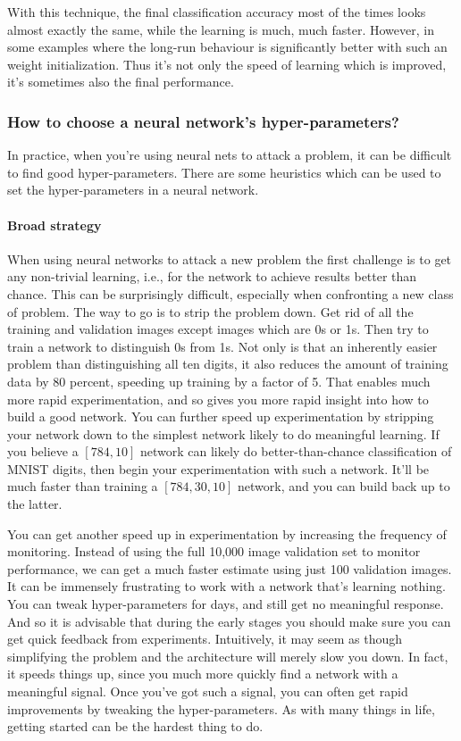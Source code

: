\documentclass[12pt, letterpaper]{article}
\theoremstyle{definition}
\let\tb\textbf
\begin{document}
With this technique, the final classification accuracy most of the times looks almost exactly the same, while the learning is much, much faster. However, in some examples where the long-run behaviour is significantly better with such an weight initialization. Thus it's not only the speed of learning which is improved, it's sometimes also the final performance.

\subsubsection{How to choose a neural network's hyper-parameters?}
In practice, when you're using neural nets to attack a problem, it can be difficult to find good hyper-parameters. There are some heuristics which can be used to set the hyper-parameters in a neural network.

\paragraph{\tb{Broad strategy}} When using neural networks to attack a new problem the first challenge is to get any non-trivial learning, i.e., for the network to achieve results better than chance. This can be surprisingly difficult, especially when confronting a new class of problem.  The way to go is to strip the problem down. Get rid of all the training and validation images except images which are 0s or 1s. Then try to train a network to distinguish 0s from 1s. Not only is that an inherently easier problem than distinguishing all ten digits, it also reduces the amount of training data by 80 percent, speeding up training by a factor of 5. That enables much more rapid experimentation, and so gives you more rapid insight into how to build a good network. You can further speed up experimentation by stripping your network down to the simplest network likely to do meaningful learning. If you believe a $[784, 10]$ network can likely do better-than-chance classification of MNIST digits, then begin your experimentation with such a network. It'll be much faster than training a $[784, 30, 10]$ network, and you can build back up to the latter.

You can get another speed up in experimentation by increasing the frequency of monitoring. Instead of using the full 10,000 image validation set to monitor performance, we can get a much faster estimate using just 100 validation images. It can be immensely frustrating to work with a network that's learning nothing. You can tweak hyper-parameters for days, and still get no meaningful response. And so it is advisable that during the early stages you should make sure you can get quick feedback from experiments. Intuitively, it may seem as though simplifying the problem and the architecture will merely slow you down. In fact, it speeds things up, since you much more quickly find a network with a meaningful signal. Once you've got such a signal, you can often get rapid improvements by tweaking the hyper-parameters. As with many things in life, getting started can be the hardest thing to do.
\end{document}

